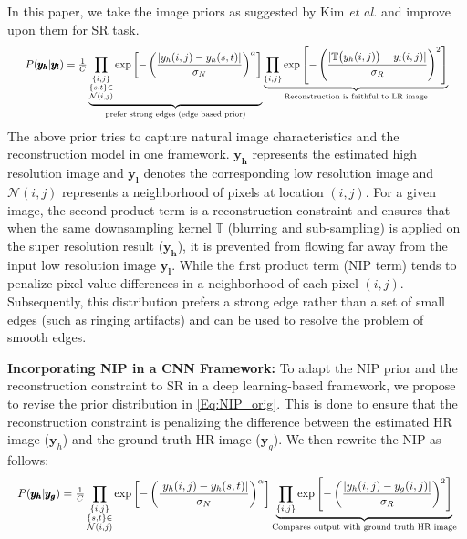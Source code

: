 \documentclass[9pt]{article}
\newcommand{\vect}[1]{\pmb{#1}}
\def\bea{\begin{eqnarray}}
\def\eea{\end{eqnarray}}
\begin{document}
In this paper, we take the image priors as suggested by Kim \emph{et al.} \cite{kim2010single,tappen2003exploiting} and improve upon them for SR task.
\bea\resizebox{0.96\columnwidth}{!}{$
        P(\vect {y_h} | \vect {y_l}) = \frac{1}{C} \underbrace{ \prod_{\substack{\{i,j\} \\ \{s,t\}\in \\\mathcal{N}(i,j)} }  \exp \left[ - \left( \frac{|y_h(i,j) - y_h(s,t)|}{\sigma_N} \right)^\alpha \right] }_{\text{prefer strong edges (edge based prior)}}
                                    \underbrace{ \prod_{ \{i,j\}  }  \exp \left[ - \left( \frac{|\mathbb{T} \big( y_h(i,j) \big) - y_l(i,j)|}{\sigma_R} \right)^2 \right] }_{\text{Reconstruction is faithful to LR image}} \label{Eq:NIP_orig}
                                    $}
\eea
The above prior tries to capture natural image characteristics  and  the reconstruction model in one framework. $\vect{y_h}$ represents the estimated high resolution image and $\vect{y_l}$ denotes the corresponding low resolution image and $\mathcal{N}(i,j)$ represents a neighborhood of pixels at location $(i,j)$. For a given image, the second product
term is a reconstruction constraint and ensures that  when the same downsampling kernel $\mathbb{T}$ (blurring and sub-sampling) is applied on the super resolution result ($\vect{y_h}$), it is prevented from flowing far away from the input low resolution image $\vect{y_l}$.
While the first product term (NIP term) tends to penalize pixel value differences in a neighborhood of each pixel $(i,j)$. Subsequently, this distribution prefers a strong edge rather than
a set of small edges (such as ringing artifacts) and can be used to resolve the problem
of smooth edges.

\noindent \textbf{Incorporating NIP in a CNN Framework:} To adapt the NIP prior and the reconstruction constraint to SR in a deep learning-based framework, we propose to revise the prior distribution in \eqref{Eq:NIP_orig}. This is done   to ensure that the reconstruction constraint is penalizing the difference between the estimated HR image ($\vect y_h$) and the ground truth HR image ($\vect y_g$). %
We then rewrite the NIP as follows:
\bea \resizebox{\columnwidth}{!}{$
        P(\vect {y_h} | \vect {y_g}) = \frac{1}{C} \displaystyle\prod_{\substack{\{i,j\} \\ \{s,t\}\in \\\mathcal{N}(i,j)} }  \exp \left[ - \left( \frac{|y_h(i,j) - y_h(s,t)|}{\sigma_N} \right)^\alpha \right]
                                    \underbrace{ \prod_{ \{i,j\}  }  \exp \left[ - \left( \frac{| y_h(i,j)  - y_g(i,j)|}{\sigma_R} \right)^2 \right] }_{\text{Compares output with ground truth HR image}}
                                    $}
                                    \label{Eq:NIP_prior}
\eea
\end{document}
